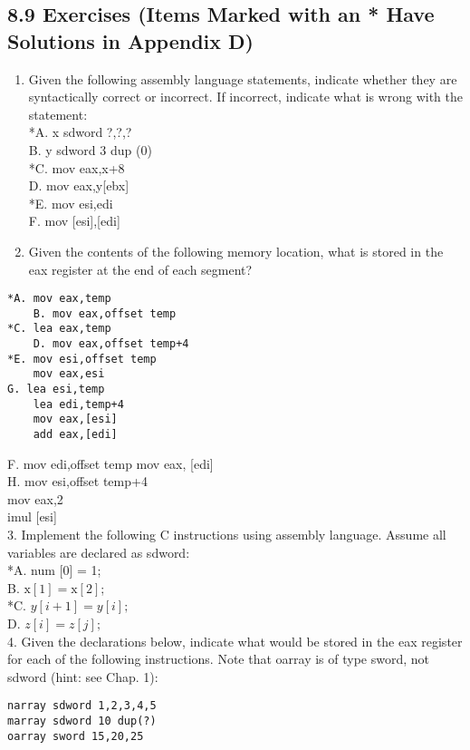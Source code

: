 \documentclass[10pt]{article}
\begin{document}
\subsection*{8.9 Exercises (Items Marked with an * Have Solutions in Appendix D)}
\begin{enumerate}
  \item Given the following assembly language statements, indicate whether they are syntactically correct or incorrect. If incorrect, indicate what is wrong with the statement:\\
*A. x sdword ?,?,?\\
B. y sdword 3 dup (0)\\
*C. mov eax,x+8\\[0pt]
D. mov eax,y[ebx]\\
*E. mov esi,edi\\[0pt]
F. mov [esi],[edi]
  \item Given the contents of the following memory location, what is stored in the eax register at the end of each segment?
\end{enumerate}

\begin{verbatim}
*A. mov eax,temp
    B. mov eax,offset temp
*C. lea eax,temp
    D. mov eax,offset temp+4
*E. mov esi,offset temp
    mov eax,esi
G. lea esi,temp
    lea edi,temp+4
    mov eax,[esi]
    add eax,[edi]
\end{verbatim}

F. mov edi,offset temp mov eax, [edi]\\
H. mov esi,offset temp+4\\
mov eax,2\\[0pt]
imul [esi]\\
3. Implement the following C instructions using assembly language. Assume all variables are declared as sdword:\\[0pt]
*A. num [0] = 1;\\
B. $\mathrm{x}[1]=\mathrm{x}[2]$;\\
*C. $y[i+1]=y[i] ;$\\
D. $z[i]=z[j] ;$\\
4. Given the declarations below, indicate what would be stored in the eax register for each of the following instructions. Note that oarray is of type sword, not sdword (hint: see Chap. 1):

\begin{verbatim}
narray sdword 1,2,3,4,5
marray sdword 10 dup(?)
oarray sword 15,20,25
\end{verbatim}
\end{document}
